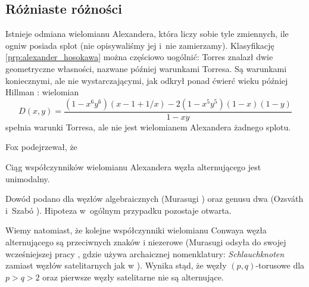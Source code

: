 
\subsection{Różniaste różności}
Istnieje odmiana wielomianu Alexandera, która liczy sobie tyle zmiennych, ile ogniw posiada splot (nie opisywaliśmy jej i~nie zamierzamy).
Klasyfikację \ref{prp:alexander_hosokawa} można częściowo uogólnić: Torres \cite{torres53} znalazł dwie geometryczne własności, nazwane później warunkami Torresa.
%
%
Są warunkami koniecznymi, ale nie wystarczającymi, jak odkrył ponad ćwierć wieku później Hillman \cite{hillman81}: wielomian
%
\begin{equation}
    D(x,y) = \frac{(1 - x^6y^6)(x - 1 + 1/x) - 2(1 - x^5y^5)(1 - x)(1 - y)}{1-xy}
\end{equation}
spełnia warunki Torresa, ale nie jest wielomianem Alexandera żadnego splotu.

Fox \cite{fox62} podejrzewał, że
%
\begin{conjecture}
%
    Ciąg współczynników wielomianu Alexandera węzła alternującego jest unimodalny.
\end{conjecture}
Dowód podano dla węzłów algebraicznych (Murasugi \cite{murasugi85}) oraz genusu dwa (Ozsváth i~Szabó \cite{ozsvath03}).
%
%
%
Hipoteza w~ogólnym przypadku pozostaje otwarta.

Wiemy natomiast, że kolejne współczynniki wielomianu Conwaya węzła alternującego są przeciwnych znaków i niezerowe (Murasugi \cite[s. 242]{murasugi96} odsyła do swojej wcześniejszej pracy \cite{murasugi59}, gdzie używa archaicznej nomenklatury: \emph{Schlauchknoten} zamiast węzłów satelitarnych jak w \cite[s. 245]{schubert53}).
%
Wynika stąd, że węzły $(p, q)$-torusowe dla $p > q > 2$ oraz pierwsze węzły satelitarne nie są alternujące.



